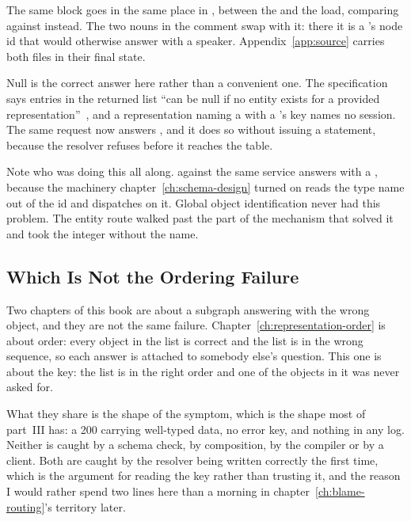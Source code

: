 %
The same block goes in the same place in , between the
 and the load, comparing against  instead. The
two nouns in the comment swap with it: there it is a 's node id
that would otherwise answer with a speaker. Appendix~\ref{app:source} carries
both files in their final state.

%
Null is the correct answer here rather than a convenient one. The specification
says entries in the returned list \enquote{can be null if no entity exists for a
provided representation}~\autocite{apollosubgraphspec}, and a representation
naming a  with a 's key names no session. The same
request now answers , and it does so
without issuing a statement, because the resolver refuses before it reaches the
table.

%
Note who was doing this all along.  against the
same service answers with a , because the machinery
chapter~\ref{ch:schema-design} turned on reads the type name out of the id and
dispatches on it. Global object identification never had this problem. The
entity route walked past the part of the mechanism that solved it and took the
integer without the name.

\subsection{Which Is Not the Ordering Failure}

%
Two chapters of this book are about a subgraph answering with the wrong object,
and they are not the same failure. Chapter~\ref{ch:representation-order} is
about order: every object in the list is correct and the list is in the wrong
sequence, so each answer is attached to somebody else's question. This one is
about the key: the list is in the right order and one of the objects in it was
never asked for.

%
What they share is the shape of the symptom, which is the shape most of
part~III has: a 200 carrying well-typed data, no error key, and nothing in any
log. Neither is caught by a schema check, by composition, by the compiler or by
a client. Both are caught by the resolver being written correctly the first
time, which is the argument for reading the key rather than trusting it, and
the reason I would rather spend two lines here than a morning in
chapter~\ref{ch:blame-routing}'s territory later.
%
